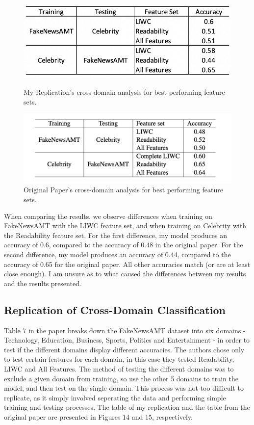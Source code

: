 \documentclass{article}
\begin{document}
\begin{figure}[b]
  \centering
  \begin{minipage}[b]{0.4\textwidth}
    \includegraphics[width=\textwidth]{Results_For_Paper/Table6Me.png}
    \caption{My Replication's cross-domain analysis for best performing feature sets.}
  \end{minipage}
  \hfill
  \begin{minipage}[b]{0.4\textwidth}
    \includegraphics[width=\textwidth]{Results_For_Paper/Table6Real.png}
    \caption{Original Paper's cross-domain analysis for best performing feature sets.}
  \end{minipage}
\end{figure}

When comparing the results, we observe differences when training on FakeNewsAMT with the LIWC feature set, and when training on Celebrity with the Readability feature set. For the first difference, my model produces an accuracy of 0.6, compared to the accuracy of 0.48 in the original paper. For the second difference, my model produces an accuracy of 0.44, compared to the accuracy of 0.65 for the original paper. All other accuracies match (or are at least close enough). I am unsure as to what caused the differences between my results and the results presented. 

\subsection{Replication of Cross-Domain Classification}

Table 7 in the paper breaks down the FakeNewsAMT dataset into six domains - Technology, Education, Business, Sports, Politics and Entertainment - in order to test if the different domains display different accuracies. The authors chose only to test certain features for each domain, in this case they tested Readability, LIWC and All Features. The method of testing the different domains was to exclude a given domain from training, so use the other 5 domains to train the model, and then test on the single domain. This process was not too difficult to replicate, as it simply involved seperating the data and performing simple training and testing processes. The table of my replication and the table from the original paper are presented in Figures 14 and 15, respectively.
\end{document}
